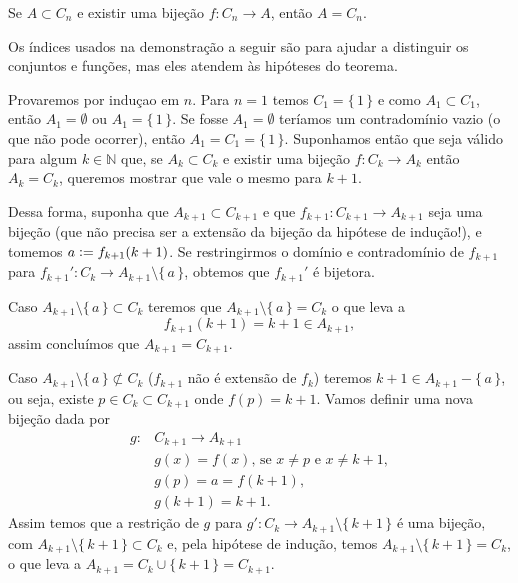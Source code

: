 \documentclass[../main.tex]{subfiles}
\begin{document}
\begin{teo}\label{enum-teo-bijecaoACn}
    Se $A \subset C_n$ e existir uma bijeção $f \colon C_n \to A$, então $A = C_n$.
\end{teo}
\begin{dem}
    Os índices usados na demonstração a seguir são para ajudar a distinguir os conjuntos e funções, mas eles atendem às hipóteses do teorema.
    
    Provaremos por induçao em $n$. Para $n = 1$ temos $C_1 = \{\,1\,\}$ e como $A_1 \subset C_1$, então $A_1 = \emptyset $ ou $ A_1 = \{\,1\,\}$. Se fosse $A_1 = \emptyset$ teríamos um contradomínio vazio (o que não pode ocorrer), então $A_1 = C_1 = \{\,1\,\}$. Suponhamos então que seja válido para algum $k \in \mathbb{N}$ que, se $A_k \subset C_k $ e existir uma bijeção $f \colon C_k \to A_k$ então $A_k = C_k$, queremos mostrar que vale o mesmo para $k+1$.

    Dessa forma, suponha que $A_{k+1} \subset C_{k+1}$ e que $f_{k+1} \colon C_{k+1} \to A_{k+1}$ seja uma bijeção (que não precisa ser a extensão da bijeção da hipótese de indução!), e tomemos $a \vcentcolon= f_{k+1}(k+1)$. Se restringirmos o domínio e contradomínio de $f_{k+1}$ para 
    $f_{k+1}' \colon C_k \to A_{k+1} \setminus \{\,a\,\}$, obtemos que $f_{k+1}'$ é bijetora.

    Caso $A_{k+1} \setminus \{\,a\,\} \subset C_k$ teremos que $A_{k+1} \setminus \{\,a\,\} = C_k$ o que leva a 
    \[ f_{k+1}(k+1) = k+1 \in A_{k+1},\] 
    assim concluímos que $A_{k+1} = C_{k+1}$. 
    
    Caso $A_{k+1} \setminus \{\,a\,\} \not\subset C_k$ ($f_{k+1}$ não é extensão de $f_k$)
    teremos $k+1 \in A_{k+1} - \{\,a\,\}$, ou seja, existe $p \in C_{k} \subset C_{k+1}$ onde $f(p) = k+1$. Vamos definir uma nova bijeção dada por
    \begin{align*}
        g \colon &C_{k+1} \to A_{k+1} \\
        &g(x) = f(x) \text{, se } x \neq p \text{ e } x \neq k+1, \\
        &g(p) = a = f(k+1), \\
        &g(k+1) = k+1.
    \end{align*}
    Assim temos que a restrição de $g$ para $g' \colon C_k \to A_{k+1} \setminus \{\,k+1\,\}$ é uma bijeção, com $A_{k+1} \setminus \{\,k+1\,\} \subset C_k$ e, pela hipótese de indução, temos $A_{k+1} \setminus \{\,k+1\,\} = C_k$, o que leva a $A_{k+1} = C_k \cup \{\,k+1\,\} = C_{k+1}$. 
    
\end{dem}
\end{document}
